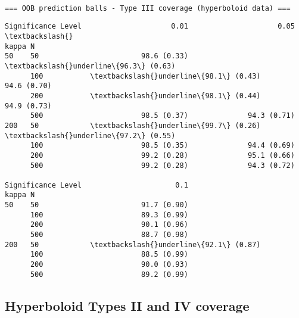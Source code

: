 \documentclass[11pt]{article}
\begin{document}
    
    \begin{Verbatim}[commandchars=\\\{\}]

=== OOB prediction balls - Type III coverage (hyperboloid data) ===
    \end{Verbatim}

    
    \begin{Verbatim}[commandchars=\\\{\}]
Significance Level                     0.01                     0.05  \textbackslash{}
kappa N                                                                
50    50                        98.6 (0.33)  \textbackslash{}underline\{96.3\} (0.63)   
      100           \textbackslash{}underline\{98.1\} (0.43)              94.6 (0.70)   
      200           \textbackslash{}underline\{98.1\} (0.44)              94.9 (0.73)   
      500                       98.5 (0.37)              94.3 (0.71)   
200   50            \textbackslash{}underline\{99.7\} (0.26)  \textbackslash{}underline\{97.2\} (0.55)   
      100                       98.5 (0.35)              94.4 (0.69)   
      200                       99.2 (0.28)              95.1 (0.66)   
      500                       99.2 (0.28)              94.3 (0.72)   

Significance Level                      0.1  
kappa N                                      
50    50                        91.7 (0.90)  
      100                       89.3 (0.99)  
      200                       90.1 (0.96)  
      500                       88.7 (0.98)  
200   50            \textbackslash{}underline\{92.1\} (0.87)  
      100                       88.5 (0.99)  
      200                       90.0 (0.93)  
      500                       89.2 (0.99)  
    \end{Verbatim}

    
    \subsection{Hyperboloid Types II and IV
coverage}\label{hyperboloid-types-ii-and-iv-coverage}
\end{document}
